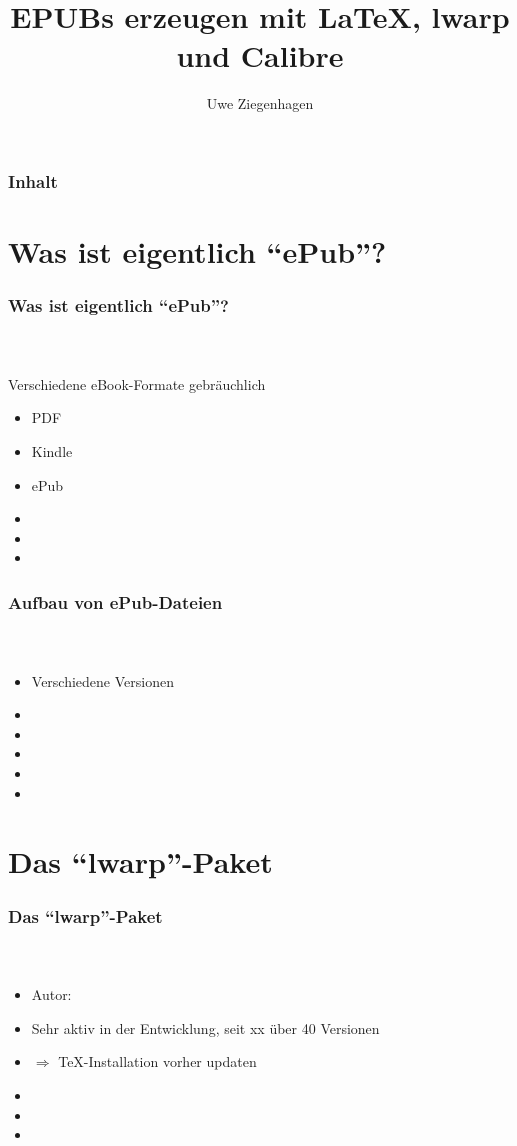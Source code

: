 \documentclass[12pt,ngerman]{beamer}
\author{Uwe Ziegenhagen}
\title{EPUBs erzeugen mit LaTeX, lwarp und Calibre}
\begin{document}
\begin{frame}

\maketitle

\end{frame}

\begin{frame}
\frametitle{Inhalt}

\tableofcontents

\end{frame}

\section{Was ist eigentlich \enquote{ePub}?}

\begin{frame}
\frametitle{Was ist eigentlich \enquote{ePub}?}
\framesubtitle{~}

Verschiedene eBook-Formate gebräuchlich

\begin{itemize}
\item PDF
\item Kindle
\item ePub
\item 
\item 
\item 
\end{itemize}

\end{frame}

\begin{frame}
\frametitle{Aufbau von ePub-Dateien}
\framesubtitle{~}

\begin{itemize}
\item Verschiedene Versionen
\item 
\item 
\item 
\item 
\item 
\end{itemize}
\end{frame}

\section{Das \enquote{lwarp}-Paket}

\begin{frame}
\frametitle{Das \enquote{lwarp}-Paket}
\framesubtitle{~}

\begin{itemize}
\item Autor: 
\item Sehr aktiv in der Entwicklung, seit xx über 40 Versionen
\item $\Rightarrow$ \TeX-Installation vorher updaten
\item 
\item 
\item 
\end{itemize}
\end{frame}
\end{document}
